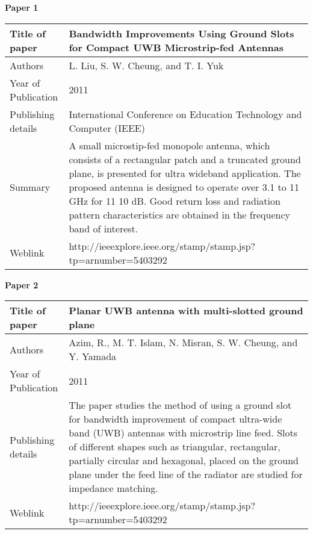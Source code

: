 \documentclass[12pt]{article}
\begin{document}
	
	\begin{flushleft}
		\textbf{Paper 1}
	\end{flushleft}

	\begin{center}
		   \begin{table}[h]

		   	\begin{tabular}{ |l|p{11cm}| }
		   		\hline
		   		Title of paper &  Bandwidth Improvements Using Ground Slots for Compact UWB Microstrip-fed Antennas \\
		   		\hline
		   		Authors & L. Liu, S. W. Cheung, and T. I. Yuk \\
		   		\hline
		   		Year of Publication & 2011 \\
		   		\hline
		   		Publishing details & International Conference on Education Technology and Computer (IEEE) \\ \hline
		   		Summary & A small microstip-fed monopole antenna, which consists of a rectangular patch and a truncated ground plane, is presented for ultra wideband application. The proposed antenna is designed to operate over 3.1 to 11 GHz for 11 10 dB. Good return loss and radiation pattern characteristics are obtained in the frequency band of interest.\\
		   		\hline
		   		Weblink & http://ieeexplore.ieee.org/stamp/stamp.jsp?tp=arnumber=5403292 \\
		   		\hline
		   	\end{tabular}

		   \end{table}
	\end{center}

	\begin{flushleft}
		\textbf{Paper 2}
	\end{flushleft}


	 \begin{center}
	 	\begin{table}[h]
	 		\centering
	 		\begin{tabular}{ |l|p{11cm}| }
	 			\hline
	 			Title of paper &  Planar UWB antenna with multi-slotted ground plane \\
	 			\hline
	 			Authors & Azim, R., M. T. Islam, N. Misran, S. W. Cheung, and Y. Yamada \\
	 			\hline
	 			Year of Publication & 2011 \\
	 			\hline
	 			Publishing details & The paper studies the method of using a ground slot for bandwidth improvement of compact ultra-wide band (UWB) antennas with microstrip line feed. Slots of different shapes such as triangular, rectangular, partially circular and hexagonal, placed on the ground plane under the feed line of the radiator are studied for impedance matching.\\
	 			\hline
	 			Weblink & http://ieeexplore.ieee.org/stamp/stamp.jsp?tp=arnumber=5403292 \\
	 			\hline
	 		\end{tabular}

	 	\end{table}
	 \end{center}
\end{document}

